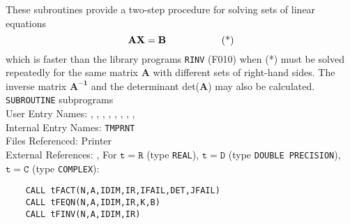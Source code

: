                                
                 
\Submitter{}                                    
   
These subroutines provide a two-step procedure for solving sets of
linear equations
$$\mathbf{AX=B} \mbox{\hspace{2cm}(*)}$$
which is faster than the library programs {\tt RINV} (F010) when (*)
must be solved repeatedly for the same matrix {\bf A} with different
sets of right-hand sides. The inverse matrix $\mathbf{A^{-1}}$ and the
determinant det({\bf A}) may also be calculated.
\Structure
{\tt SUBROUTINE} subprograms\\
User Entry Names: , , ,
, , ,
, ,  \\
Internal Entry Names:  {\tt TMPRNT}\\
Files Referenced: Printer\\
External References: , 
\Usage
For $\mathtt{t=R}$ (type {\tt REAL}), $\mathtt{t=D}$ (type
{\tt DOUBLE PRECISION}), $\mathtt{t=C}$ (type {\tt COMPLEX}):
\begin{verbatim}
    CALL tFACT(N,A,IDIM,IR,IFAIL,DET,JFAIL)
    CALL tFEQN(N,A,IDIM,IR,K,B)
    CALL tFINV(N,A,IDIM,IR)
\end{verbatim}
